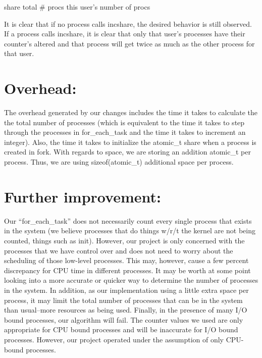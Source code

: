 \documentclass[10pt]{article}
\begin{document}
share \* total \# procs \/ this user's number of procs

It is clear that if no process calls incshare, the desired behavior is still observed. If a process calls incshare, it is clear that only that user's processes have their counter's altered and that process will get twice as much as the other process for that user.

\section{Overhead:}

The overhead generated by our changes includes the time it takes to calculate the the total number of processes (which is equivalent to the time it takes to step through the processes in for\_each\_task and the time it takes to increment an integer). Also, the time it takes to initialize the atomic\_t share when a process is created in fork. With regards to space, we are storing an addition atomic\_t per process. Thus, we are using sizeof(atomic\_t) additional space per process.

\section{Further improvement:}

Our ``for\_each\_task'' does not necessarily count every single process that exists in the system (we believe processes that do things w/r/t the kernel are not being counted, things such as init). However, our project is only concerned with the processes that we have control over and does not need to worry about the scheduling of those low-level processes. This may, however, cause a few percent discrepancy for CPU time in different processes. It may be worth at some point looking into a more accurate or quicker way to determine the number of processes in the system. In addition, as our implementation using a little extra space per process, it may limit the total number of processes that can be in the system than usual--more resources as being used. Finally, in the presence of many I/O bound processes, our algorithm will fail. The counter values we used are only appropriate for CPU bound processes and will be inaccurate for I/O bound processes. However, our project operated under the assumption of only CPU-bound processes.
\end{document}

